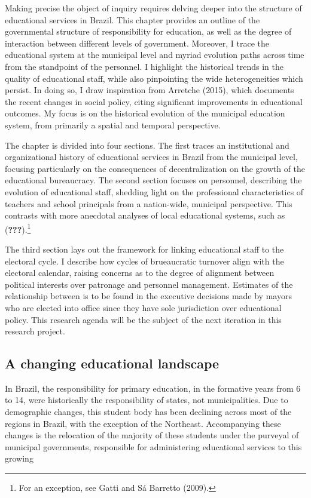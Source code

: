 \documentclass[12pt,]{article}
\let\rmarkdownfootnote\footnote%
\def\footnote{\protect\rmarkdownfootnote}
\begin{document}
Making precise the object of inquiry requires delving deeper into the
structure of educational services in Brazil. This chapter provides an
outline of the governmental structure of responsibility for education,
as well as the degree of interaction between different levels of
government. Moreover, I trace the educational system at the municipal
level and myriad evolution paths across time from the standpoint of the
personnel. I highlight the historical trends in the quality of
educational staff, while also pinpointing the wide heterogeneities which
persist. In doing so, I draw inspiration from Arretche (2015), which
documents the recent changes in social policy, citing significant
improvements in educational outcomes. My focus is on the historical
evolution of the municipal education system, from primarily a spatial
and temporal perspective.

The chapter is divided into four sections. The first traces an
institutional and organizational history of educational services in
Brazil from the municipal level, focusing particularly on the
consequences of decentralization on the growth of the educational
bureaucracy. The second section focuses on personnel, describing the
evolution of educational staff, shedding light on the professional
characteristics of teachers and school principals from a nation-wide,
municipal perspective. This contrasts with more anecdotal analyses of
local educational systems, such as ({\textbf{???}}).\footnote{For an
  exception, see Gatti and Sá Barretto (2009).}

The third section lays out the framework for linking educational staff
to the electoral cycle. I describe how cycles of brueaucratic turnover
align with the electoral calendar, raising concerns as to the degree of
alignment between political interests over patronage and personnel
management. Estimates of the relationship between is to be found in the
executive decisions made by mayors who are elected into office since
they have sole jurisdiction over educational policy. This research
agenda will be the subject of the next iteration in this research
project.

\hypertarget{a-changing-educational-landscape}{%
\subsection{A changing educational
landscape}\label{a-changing-educational-landscape}}

In Brazil, the responsibility for primary education, in the formative
years from 6 to 14, were historically the responsibility of states, not
municipalities. Due to demographic changes, this student body has been
declining across most of the regions in Brazil, with the exception of
the Northeast. Accompanying these changes is the relocation of the
majority of these students under the purveyal of municipal governments,
responsible for administering educational services to this growing
\end{document}
